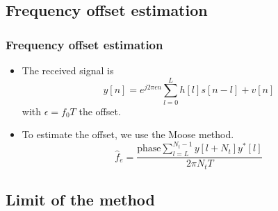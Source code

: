 \documentclass[11pt]{beamer}
\begin{document}
\subsection{Frequency offset estimation}
\begin{frame}
\frametitle{Frequency offset estimation}
\begin{itemize}
\item The received signal is
\begin{equation}
y[n] = e^{j2\pi \epsilon n} \sum_{l=0}^{L}{h[l]s[n-l]+v[n]}
\end{equation}
with $\epsilon = f_0 T$ the offset.
\item To estimate the offset, we use the Moose method.
\begin{equation}
\hat{f}_e = \frac{\text{phase} \sum_{l=L}^{N_t-1}{y[l+N_t]y^*[l]}}{2\pi N_t T}
\end{equation}

\end{itemize}

\end{frame}

\subsection{Limit of the method}
\end{document}
